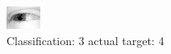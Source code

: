 \begin{figure}[h!]
\begin{center}
\includegraphics[width=0.60\columnwidth]{figures/ID2466_class_3_target_4.png}
\end{center}
\caption{ Classification: 3 actual target: 4}
\label{fig:ID2466_class_3_target_4}
\end{figure}
